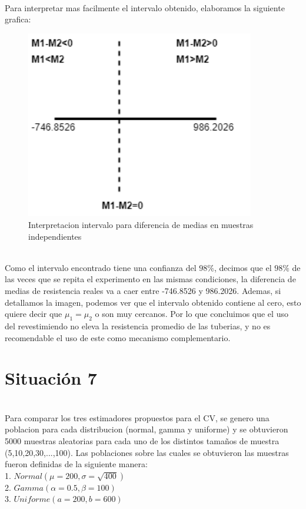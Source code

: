 \documentclass[letterpaper,12pt,onecolumn,titlepage]{article}
\begin{document}
~\\ Para interpretar mas facilmente el intervalo obtenido, elaboramos la siguiente grafica:
\begin{figure}[!h]
    \begin{center}
        \includegraphics[width=10cm]{Figuras/Grafico5.png}
        \caption{Interpretacion intervalo para diferencia de medias en muestras independientes}
        \label{fig:Densidad}
    \end{center}
\end{figure}
~\\ Como el intervalo encontrado tiene una confianza del $98\%$, decimos que el $98\%$ de las veces que se repita el experimento en las mismas condiciones, la diferencia de medias de resistencia reales va a caer entre -746.8526 y 986.2026. Ademas, si detallamos la imagen, podemos ver que el intervalo obtenido contiene al cero, esto quiere decir que $\mu_1=\mu_2$ o son muy cercanos. Por lo que concluimos que el uso del revestimiendo no eleva la resistencia promedio de las tuberias, y no es recomendable el uso de este como mecanismo complementario.

\pagebreak\section{Situaci\'{o}n 7}
~\\ Para comparar los tres estimadores propuestos para el CV, se genero una poblacion para cada distribucion (normal, gamma y uniforme) y se obtuvieron 5000 muestras aleatorias para cada uno de los distintos tama\~{n}os de muestra (5,10,20,30,...,100). Las poblaciones sobre las cuales se obtuvieron las muestras fueron definidas de la siguiente manera:
~\\ 1. $Normal(\mu=200,\sigma=\sqrt{400})$
~\\ 2. $Gamma(\alpha=0.5,\beta=100)$
~\\ 3. $Uniforme(a=200,b=600)$
\end{document}
